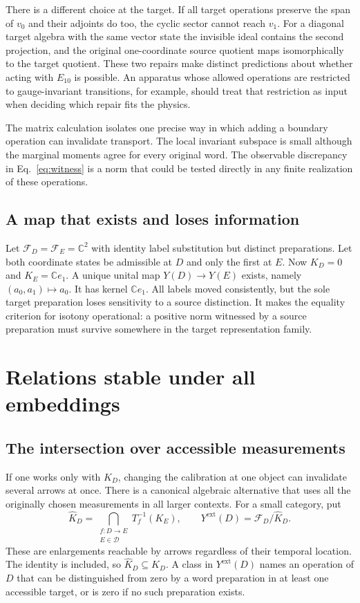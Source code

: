 \documentclass[11pt,letterpaper]{article}
\newcommand{\F}{\mathcal F}
\newcommand{\Dcat}{\mathcal D}
\newcommand{\sat}{\widehat K}
\begin{document}
There is a different choice at the target. If all target operations preserve the span of $v_0$ and their adjoints do too, the cyclic sector cannot reach $v_1$. For a diagonal target algebra with the same vector state the invisible ideal contains the second projection, and the original one-coordinate source quotient maps isomorphically to the target quotient. These two repairs make distinct predictions about whether acting with $E_{10}$ is possible. An apparatus whose allowed operations are restricted to gauge-invariant transitions, for example, should treat that restriction as input when deciding which repair fits the physics.

The matrix calculation isolates one precise way in which adding a boundary operation can invalidate transport. The local invariant subspace is small although the marginal moments agree for every original word. The observable discrepancy in Eq.~\eqref{eq:witness} is a norm that could be tested directly in any finite realization of these operations.

\subsection{A map that exists and loses information}

Let $\F_D=\F_E=\mathbb C^2$ with identity label substitution but distinct preparations. Let both coordinate states be admissible at $D$ and only the first at $E$. Now $K_D=0$ and $K_E=\mathbb Ce_1$. A unique unital map $Y(D)\to Y(E)$ exists, namely $(a_0,a_1)\mapsto a_0$. It has kernel $\mathbb Ce_1$. All labels moved consistently, but the sole target preparation loses sensitivity to a source distinction. It makes the equality criterion for isotony operational: a positive norm witnessed by a source preparation must survive somewhere in the target representation family.

\section{Relations stable under all embeddings}
\label{sec:completion}

\subsection{The intersection over accessible measurements}

If one works only with $K_D$, changing the calibration at one object can invalidate several arrows at once. There is a canonical algebraic alternative that uses all the originally chosen measurements in all larger contexts. For a small category, put
\begin{equation}
 \sat_D=\bigcap_{\substack{f:D\to E\\ E\in\Dcat}}T_f^{-1}(K_E),
 \qquad Y^{\mathrm{ext}}(D)=\F_D/\sat_D .                  \label{eq:saturated}
\end{equation}
These are enlargements reachable by arrows regardless of their temporal location. The identity is included, so $\sat_D\subseteq K_D$. A class in $Y^{\mathrm{ext}}(D)$ names an operation of $D$ that can be distinguished from zero by a word preparation in at least one accessible target, or is zero if no such preparation exists.
\end{document}
